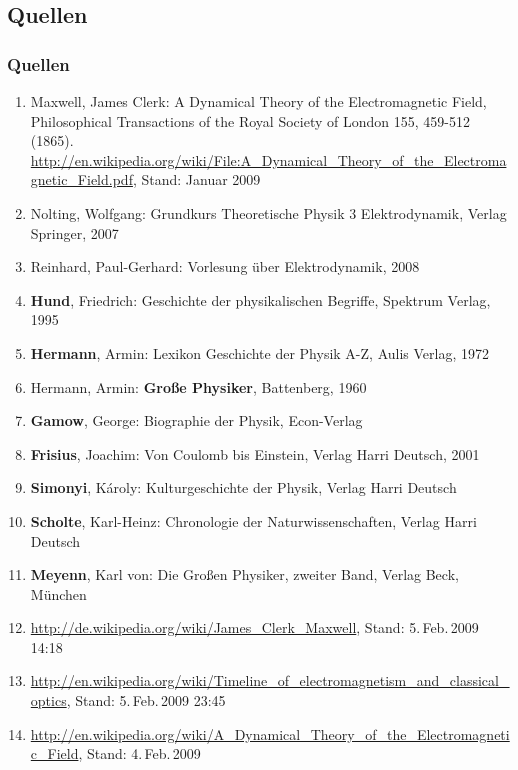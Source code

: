 \documentclass[green,10pt]{beamer}
\begin{document}
  \subsection{Quellen}
    \begin{frame}[shrink=40]
      \frametitle{Quellen}
      \begin{enumerate}
        \item Maxwell, James Clerk: A Dynamical Theory of the Electromagnetic Field, Philosophical Transactions of the Royal Society of London 155, 459-512 (1865).\\
        \url{http://en.wikipedia.org/wiki/File:A_Dynamical_Theory_of_the_Electromagnetic_Field.pdf}, Stand: Januar 2009
        \newline
        
        \item Nolting, Wolfgang: Grundkurs Theoretische Physik 3 Elektrodynamik, Verlag Springer, 2007
        \item Reinhard, Paul-Gerhard: Vorlesung über Elektrodynamik, 2008
        \newline
        
        \item \textbf{Hund}, Friedrich: Geschichte der physikalischen Begriffe, Spektrum Verlag, 1995
        \item \textbf{Hermann}, Armin: Lexikon Geschichte der Physik A-Z, Aulis Verlag, 1972
        \item Hermann, Armin: \textbf{Große Physiker}, Battenberg, 1960 
        \item \textbf{Gamow}, George: Biographie der Physik, Econ-Verlag
        \item \textbf{Frisius}, Joachim: Von Coulomb bis Einstein, Verlag Harri Deutsch, 2001
        \item \textbf{Simonyi}, Károly: Kulturgeschichte der Physik, Verlag Harri Deutsch
        \item \textbf{Scholte}, Karl-Heinz: Chronologie der Naturwissenschaften, Verlag Harri Deutsch
        \item \textbf{Meyenn}, Karl von: Die Großen Physiker, zweiter Band, Verlag Beck, München
        \newline
        
        \item \url{http://de.wikipedia.org/wiki/James_Clerk_Maxwell}, Stand: 5.\,Feb.\,2009 14:18
        \item \url{http://en.wikipedia.org/wiki/Timeline_of_electromagnetism_and_classical_optics}, Stand: 5.\,Feb.\,2009 23:45
        \item \url{http://en.wikipedia.org/wiki/A_Dynamical_Theory_of_the_Electromagnetic_Field}, Stand: 4.\,Feb.\,2009
      \end{enumerate}    
    \end{frame}
\end{document}
